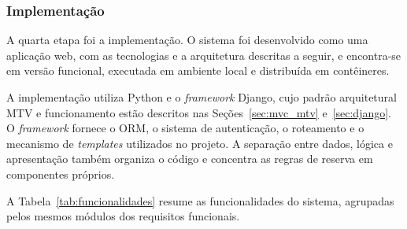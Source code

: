\documentclass[
	12pt,				%
	twoside,			%
	openany,			%
	a4paper,			%
	chapter=TITLE,		%
	section=TITLE,		%
	subsection=TITLE,	%
	subsubsection=TITLE,%
	english,			%
	french,				%
	spanish,			%
	brazil,				%
	]{abntex2}
\begin{document}
\clearpage
\subsubsection{Implementação}
\label{sec:implementacao}

A quarta etapa foi a implementação. O sistema foi desenvolvido como uma aplicação web, com as tecnologias e a arquitetura descritas a seguir, e encontra-se em versão funcional, executada em ambiente local e distribuída em contêineres.

A implementação utiliza Python e o \textit{framework} Django, cujo padrão arquitetural MTV e funcionamento estão descritos nas Seções~\ref{sec:mvc_mtv} e~\ref{sec:django}. O \textit{framework} fornece o ORM, o sistema de autenticação, o roteamento e o mecanismo de \textit{templates} utilizados no projeto. A separação entre dados, lógica e apresentação também organiza o código e concentra as regras de reserva em componentes próprios.

A Tabela~\ref{tab:funcionalidades} resume as funcionalidades do sistema, agrupadas pelos mesmos módulos dos requisitos funcionais.
\end{document}
